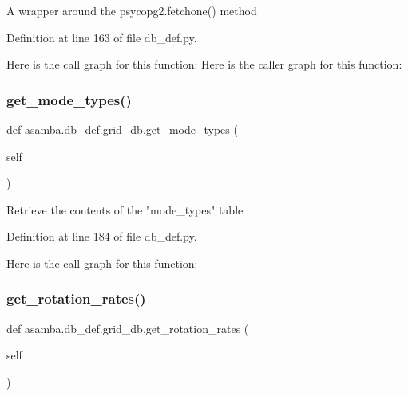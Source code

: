 \begin{DoxyVerb}A wrapper around the psycopg2.fetchone() method
\end{DoxyVerb}
 

Definition at line 163 of file db\+\_\+def.\+py.

Here is the call graph for this function\+:
Here is the caller graph for this function\+:
\mbox{\label{classasamba_1_1db__def_1_1grid__db_a636c6c1f259ea69934184876f9faa9ea}} 
\subsubsection{\texorpdfstring{get\+\_\+mode\+\_\+types()}{get\_mode\_types()}}
{\footnotesize\ttfamily def asamba.\+db\+\_\+def.\+grid\+\_\+db.\+get\+\_\+mode\+\_\+types (\begin{DoxyParamCaption}\item[{}]{self }\end{DoxyParamCaption})}

\begin{DoxyVerb}Retrieve the contents of the "mode_types" table
\end{DoxyVerb}
 

Definition at line 184 of file db\+\_\+def.\+py.

Here is the call graph for this function\+:
\mbox{\label{classasamba_1_1db__def_1_1grid__db_a27c84439882e562a5e7b53c39d43383f}} 
\subsubsection{\texorpdfstring{get\+\_\+rotation\+\_\+rates()}{get\_rotation\_rates()}}
{\footnotesize\ttfamily def asamba.\+db\+\_\+def.\+grid\+\_\+db.\+get\+\_\+rotation\+\_\+rates (\begin{DoxyParamCaption}\item[{}]{self }\end{DoxyParamCaption})}

